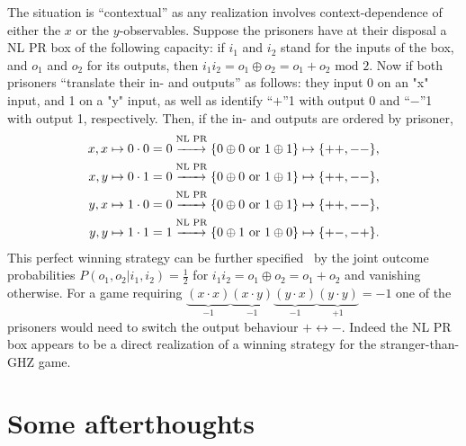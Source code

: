 \documentclass[sn-mathphys]{sn-jnl}%
\theoremstyle{thmstyleone}%
\theoremstyle{thmstyletwo}%
\theoremstyle{thmstylethree}%
\begin{document}
The situation is ``contextual'' as any realization involves context-dependence of either the $x$ or the $y$-observables.
Suppose the prisoners have at their disposal a NL PR box of the following capacity:
if $i_1$ and $i_2$ stand for the inputs of the box, and $o_1$ and $o_2$ for its outputs, then
$
i_1 i_2 = o_1 \oplus o_2 = o_1 + o_2 \text{ mod }2$.
Now if both prisoners ``translate their in- and outputs'' as follows:
they input 0 on an "x" input, and 1 on a "y" input,
as well as identify  ``$+$''1 with output 0 and ``$-$''1 with output 1, respectively.
Then, if the in- and outputs are ordered by prisoner,
\begin{equation}
\begin{aligned}
x,x & \mapsto   0 \cdot 0 = 0 \stackrel{\text{NL PR}}{\xrightarrow{\hspace*{6mm}}} \{0 \oplus 0 \text{  or  } 1 \oplus 1\} \mapsto   \{++,--\}     ,\\
x,y & \mapsto   0 \cdot 1 = 0 \stackrel{\text{NL PR}}{\xrightarrow{\hspace*{6mm}}} \{0 \oplus 0 \text{  or  } 1 \oplus 1\} \mapsto   \{++,--\}     ,\\
y,x & \mapsto   1 \cdot 0 = 0 \stackrel{\text{NL PR}}{\xrightarrow{\hspace*{6mm}}} \{0 \oplus 0 \text{  or  } 1 \oplus 1\} \mapsto   \{++,--\}     ,\\
y,y & \mapsto   1 \cdot 1 = 1 \stackrel{\text{NL PR}}{\xrightarrow{\hspace*{6mm}}} \{0 \oplus 1 \text{  or  } 1 \oplus 0\} \mapsto   \{+-,-+\}     .
\end{aligned}
\end{equation}
This perfect winning strategy can be further specified~\cite{PhysRevA.71.022101} by
the joint outcome probabilities
$P \left( o_1,o_2 \vert i_1,i_2 \right) = \frac{1}{2}$ for $i_1 i_2 = o_1 \oplus o_2 = o_1 + o_2$ and vanishing otherwise.
For a game requiring
$\underbrace{(x\cdot x)}_{-1}\underbrace{(x\cdot y)}_{-1}\underbrace{(y\cdot x)}_{-1}\underbrace{(y\cdot y)}_{+1}=-1$
one of the prisoners would need to switch the output behaviour $+ \longleftrightarrow -$.
Indeed the NL PR box appears to be a direct realization of a winning strategy  for the stranger-than-GHZ game.

\section{Some afterthoughts}
\end{document}
